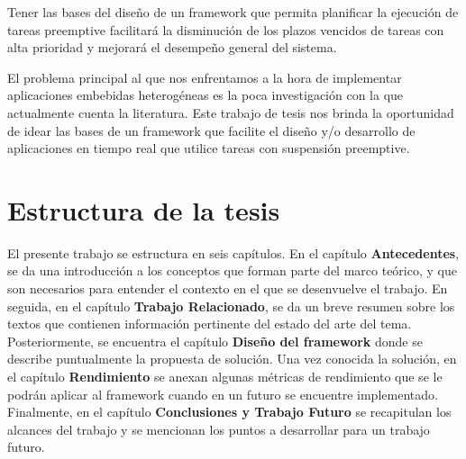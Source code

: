 Tener las bases del diseño de un framework que permita planificar la ejecución de tareas preemptive facilitará la disminución de los plazos vencidos de tareas con alta prioridad y mejorará el desempeño general del sistema.
\newline

El problema principal  al que nos enfrentamos a la hora de implementar aplicaciones embebidas heterogéneas es la poca investigación con la que actualmente cuenta la literatura. Este trabajo de tesis nos brinda la oportunidad de idear las bases de un framework que facilite el diseño y/o desarrollo de aplicaciones en tiempo real que utilice tareas con suspensión preemptive.

\section {Estructura de la tesis}

El presente trabajo se estructura en seis capítulos.
En el capítulo \textbf{Antecedentes}, se da una introducción a los conceptos que forman parte del marco teórico, y que son necesarios para entender el contexto en el que se desenvuelve el trabajo. En seguida, en el capítulo \textbf{Trabajo Relacionado}, se da un breve resumen sobre los textos que contienen información pertinente del estado del arte del tema. Posteriormente, se encuentra el capítulo \textbf{Diseño del framework} donde se describe puntualmente la propuesta de solución. Una vez conocida la solución, en el capítulo \textbf{Rendimiento} se anexan algunas métricas de rendimiento que se le podrán aplicar al framework cuando en un futuro se encuentre implementado. Finalmente, en el capítulo \textbf{Conclusiones y Trabajo Futuro} se recapitulan los alcances del trabajo y se mencionan los puntos a desarrollar para un trabajo futuro.

